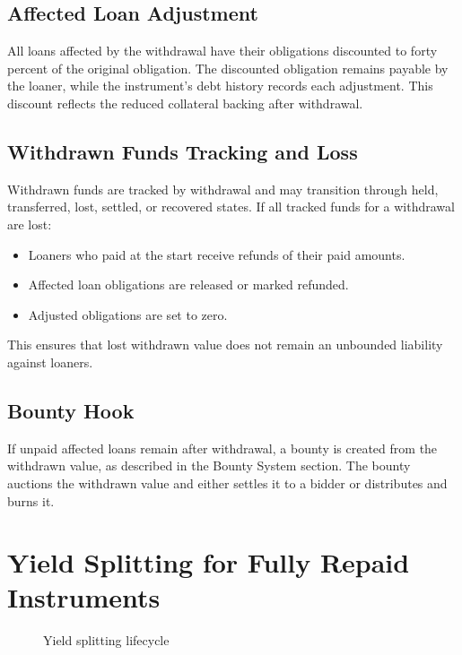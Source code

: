 \documentclass[11pt,a4paper]{article}
\begin{document}
\subsection{Affected Loan Adjustment}
All loans affected by the withdrawal have their obligations discounted to forty percent of the original obligation. The discounted obligation remains payable by the loaner, while the instrument's debt history records each adjustment. This discount reflects the reduced collateral backing after withdrawal.

\subsection{Withdrawn Funds Tracking and Loss}
Withdrawn funds are tracked by withdrawal and may transition through held, transferred, lost, settled, or recovered states. If all tracked funds for a withdrawal are lost:
\begin{itemize}
\item Loaners who paid at the start receive refunds of their paid amounts.
\item Affected loan obligations are released or marked refunded.
\item Adjusted obligations are set to zero.
\end{itemize}
This ensures that lost withdrawn value does not remain an unbounded liability against loaners.

\subsection{Bounty Hook}
If unpaid affected loans remain after withdrawal, a bounty is created from the withdrawn value, as described in the Bounty System section. The bounty auctions the withdrawn value and either settles it to a bidder or distributes and burns it.

\section{Yield Splitting for Fully Repaid Instruments}
\begin{figure}[H]
\centering
{}
\caption{Yield splitting lifecycle}
\label{fig:yieldsplit}
\end{figure}
\end{document}
